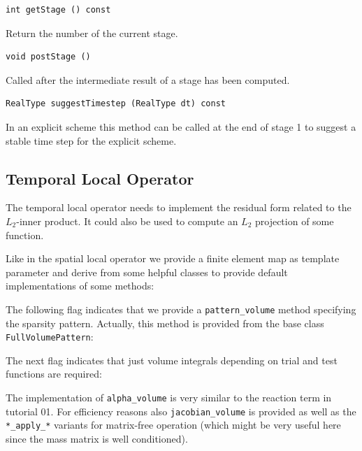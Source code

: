 \documentclass[a4paper,12pt]{article}
\begin{document}
\begin{lstlisting}[basicstyle=\ttfamily,
frame=single,
backgroundcolor=\color{listingbg}]
int getStage () const
\end{lstlisting}
Return the number of the current stage.

\begin{lstlisting}[basicstyle=\ttfamily,
frame=single,
backgroundcolor=\color{listingbg}]
void postStage ()
\end{lstlisting}
Called after the intermediate result of a stage has been computed.

\begin{lstlisting}[basicstyle=\ttfamily,
frame=single,
backgroundcolor=\color{listingbg}]
RealType suggestTimestep (RealType dt) const
\end{lstlisting}
In an explicit scheme this method can be called at the end of stage 1
to suggest a stable time step for the explicit scheme.

\subsection{Temporal Local Operator}

The temporal local operator needs to implement the
residual form related to the $L_2$-inner product. It could also
be used to compute an $L_2$ projection of some function.

Like in the spatial local operator we provide a finite element
map as template parameter and derive from some helpful
classes to provide default implementations of some methods:


The following flag indicates that we provide a \lstinline{pattern_volume} method
specifying the sparsity pattern. Actually, this method is provided from the base class
\lstinline{FullVolumePattern}:


The next flag indicates that just volume integrals depending
on trial and test functions are required:


The implementation of \lstinline{alpha_volume}
is very similar to the reaction term in tutorial 01. For efficiency reasons
also \lstinline{jacobian_volume} is provided as well as the
\lstinline{*_apply_*} variants for matrix-free operation (which might
be very useful here since the mass matrix is well conditioned).
\end{document}
